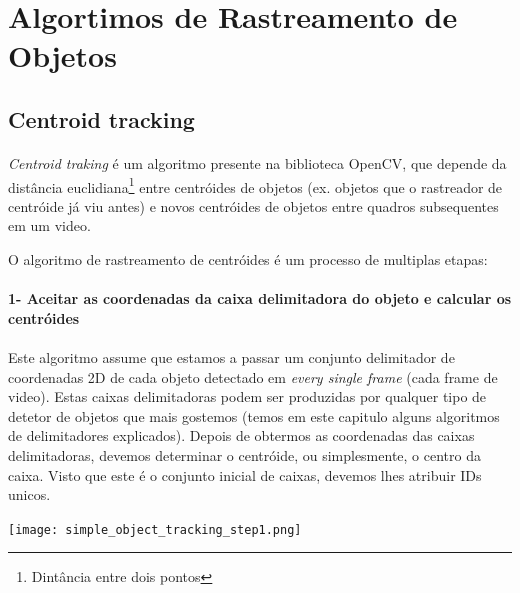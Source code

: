\section{Algortimos de Rastreamento de Objetos}
\label{chap2:subsec:algoritmosrastreamento}



\subsection{Centroid tracking}
\label{chap2:subsec:centroidtraking}



\paragraph{}
\textit{Centroid traking} é um algoritmo presente na biblioteca OpenCV, que depende da distância euclidiana\footnote{Dintância entre dois pontos} entre centróides de objetos (ex. objetos que o rastreador de centróide já viu antes) e novos centróides de objetos entre quadros subsequentes em um video.

O algoritmo de rastreamento de centróides é um processo de multiplas etapas:

\paragraph{1- Aceitar as coordenadas da caixa delimitadora do objeto e calcular os centróides}
\paragraph{}
Este algoritmo assume que estamos a passar um conjunto delimitador de coordenadas 2D de cada objeto detectado em \textit{every single frame} (cada frame de video).
\newline
Estas caixas delimitadoras podem ser produzidas por qualquer tipo de detetor de objetos que mais gostemos (temos em este capitulo alguns algoritmos de delimitadores explicados).
\newline
Depois de obtermos as coordenadas das caixas delimitadoras, devemos determinar o centróide, ou simplesmente, o centro da caixa.
\newline
Visto que este é o conjunto inicial de caixas, devemos lhes atribuir IDs unicos.
\begin{center}
  \texttt{[image: simple\_object\_tracking\_step1.png]}
  \label{img:centroid_traking1}  
\end{center}

